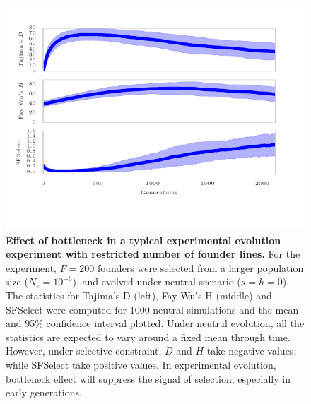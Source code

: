 \begin{figure}[H]
	\centering 
	\includegraphics[trim=3.2in 0.1in 3.2in 0.2in , 
	clip,width=\textwidth]{figures/bottleneck}
	\caption{{\bf Effect of bottleneck in a typical experimental
            evolution experiment with restricted number of founder
            lines.} For the experiment, $F=200$ founders were selected
          from a larger population size ($N_e=10^{-6}$), and evolved
          under neutral scenario ($s=h=0$). The statistics for
          Tajima's D (left), Fay Wu's H (middle) and SFSelect were
          computed for 1000 neutral simulations and the mean and 95\%
          confidence interval plotted. Under neutral evolution, all
          the statistics are expected to vary around a fixed mean
          through time. However, under selective constraint, $D$ and
          $H$ take negative values, while SFSelect take positive
          values. In experimental evolution, bottleneck effect will
          suppress the signal of selection, especially in early
          generations. }
	\label{fig:bottleneck}
\end{figure}


